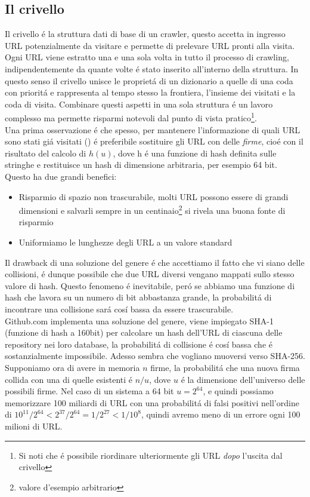 \subsection{Il crivello}
Il crivello é la struttura dati di base di un crawler, questo accetta in ingresso URL potenzialmente da visitare e permette di prelevare URL pronti alla visita. Ogni URL viene estratto una e una sola volta in tutto il processo di crawling, indipendentemente da quante volte é stato inserito all'interno della struttura. In questo senso il crivello unisce le proprietá di un dizionario a quelle di una coda con prioritá e rappresenta al tempo stesso la frontiera, l'insieme dei visitati e la coda di visita. Combinare questi aspetti in una sola struttura é un lavoro complesso ma permette risparmi notevoli dal punto di vista pratico\footnote{Si noti che é possibile riordinare ulteriormente gli URL \textit{dopo} l'uscita dal crivello}.\\
Una prima osservazione é che spesso, per mantenere l'informazione di quali URL sono stati giá visitati () é preferibile sostituire gli URL con delle \textit{firme}, cioé con il risultato del calcolo di $h(u)$, dove h é una funzione di hash definita sulle stringhe e restituisce un hash di dimensione arbitraria, per esempio 64 bit. Questo ha due grandi benefici:
\begin{itemize}
    \item Risparmio di spazio non trascurabile, molti URL possono essere di grandi dimensioni e salvarli sempre in un centinaio\footnote{valore d'esempio arbitrario} si rivela una buona fonte di risparmio
    \item Uniformiamo le lunghezze degli URL a un valore standard
\end{itemize}
Il drawback di una soluzione del genere é che accettiamo il fatto che vi siano delle collisioni, é dunque possibile che due URL diversi vengano mappati sullo stesso valore di hash. Questo fenomeno é inevitabile, peró se abbiamo una funzione di hash che lavora su un numero di bit abbastanza grande, la probabilitá di incontrare una collisione sará cosí bassa da essere trascurabile.\\
Github.com implementa una soluzione del genere, viene impiegato SHA-1 (funzione di hash a 160bit) per calcolare un hash dell'URL di ciascuna delle repository nei loro database, la probabilitá di collisione é cosí bassa che é sostanzialmente impossibile. Adesso sembra che vogliano muoversi verso SHA-256.\\
Supponiamo ora di avere in memoria $n$ firme, la probabilitá che una nuova firma collida con una di quelle esistenti é $n/u$, dove $u$ é la dimensione dell'universo delle possibili firme. Nel caso di un sistema a 64 bit $u = 2^{64}$, e quindi possiamo memorizzare 100 miliardi di URL con una probabilitá di falsi positivi nell'ordine di $10^{11} / 2^{64} < 2^{37} / 2^{64} = 1 / 2^{27} < 1 / 10^8$, quindi avremo meno di un errore ogni 100 milioni di URL.\\
